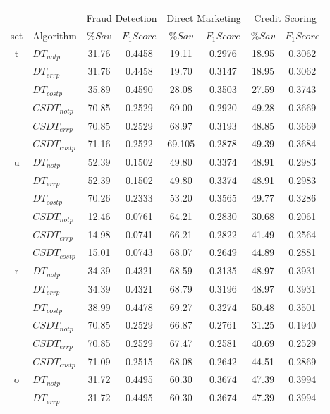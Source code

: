 \begin{table}
  \centering
  \footnotesize
  \begin{tabular}{|c|l|c c|c c |c c|}
    \multicolumn{8}{c}{ }\\
    \cline{3-8}
    \multicolumn{2}{c}{}& \multicolumn{2}{|c}{Fraud Detection} & \multicolumn{2}{|c|}{Direct 
    Marketing} &
    \multicolumn{2}{|c|}{Credit Scoring}\\
    \hline
    set&Algorithm & $\%Sav$ & $F_1Score$ & $\%Sav$ & $F_1Score$ & $\%Sav$ & $F_1Score$\\
    \hline
    t&$DT_{not p}$& 31.76&0.4458&19.11&0.2976&18.95&0.3062\\
    &$DT_{err p}$&  31.76&0.4458&19.70&0.3147&18.95&0.3062\\
    &$DT_{cost p}$& 35.89&0.4590&28.08&0.3503&27.59&0.3743\\
    &$CSDT_{not p}$&  70.85&0.2529&69.00&0.2920&49.28&0.3669\\
    &$CSDT_{err p}$&  70.85&0.2529&68.97&0.3193&48.85&0.3669\\
    &$CSDT_{cost p}$& 71.16&0.2522&69.105&0.2878&49.39&0.3684\\
    \hline
    u&$DT_{not p}$& 52.39&0.1502&49.80&0.3374&48.91&0.2983\\
    &$DT_{err p}$&  52.39&0.1502&49.80&0.3374&48.91&0.2983\\
    &$DT_{cost p}$& 70.26&0.2333&53.20&0.3565&49.77&0.3286\\
    &$CSDT_{not p}$&  12.46&0.0761&64.21&0.2830&30.68&0.2061\\
    &$CSDT_{err p}$&  14.98&0.0741&66.21&0.2822&41.49&0.2564\\
    &$CSDT_{cost p}$& 15.01&0.0743&68.07&0.2649&44.89&0.2881\\
    \hline
    r&$DT_{not p}$& 34.39&0.4321&68.59&0.3135&48.97&0.3931\\
    &$DT_{err p}$&  34.39&0.4321&68.79&0.3196&48.97&0.3931\\
    &$DT_{cost p}$& 38.99&0.4478&69.27&0.3274&50.48&0.3501\\
    &$CSDT_{not p}$&  70.85&0.2529&66.87&0.2761&31.25&0.1940\\
    &$CSDT_{err p}$&  70.85&0.2529&67.47&0.2581&40.69&0.2529\\
    &$CSDT_{cost p}$& 71.09&0.2515&68.08&0.2642&44.51&0.2869\\
    \hline
    o&$DT_{not p}$& 31.72&0.4495&60.30&0.3674&47.39&0.3994\\
    &$DT_{err p}$&  31.72&0.4495&60.30&0.3674&47.39&0.3994\\

\end{tabular}
\end{table}
